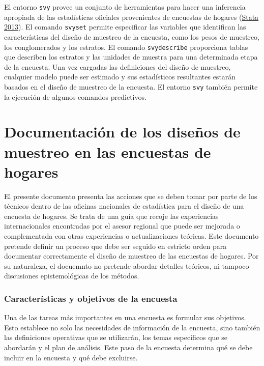 \documentclass[
  12pt,
  spanish,
]{book}
\begin{document}
El entorno \texttt{svy} provee un conjunto de herramientas para hacer una inferencia apropiada de las estadísticas oficiales provenientes de encuestas de hogares (\protect\hyperlink{ref-STATA_2017}{Stata 2013}). El comando \texttt{svyset} permite especificar las variables que identifican las características del diseño de muestreo de la encuesta, como los pesos de muestreo, los conglomerados y los estratos. El comando \texttt{svydescribe} proporciona tablas que describen los estratos y las unidades de muestra para una determinada etapa de la encuesta. Una vez cargadas las definiciones del diseño de muestreo, cualquier modelo puede ser estimado y sus estadísticos resultantes estarán basados en el diseño de muestreo de la encuesta. El entorno \texttt{svy} también permite la ejecución de algunos comandos predictivos.

\hypertarget{documentaciuxf3n-de-los-diseuxf1os-de-muestreo-en-las-encuestas-de-hogares}{%
\chapter{Documentación de los diseños de muestreo en las encuestas de hogares}\label{documentaciuxf3n-de-los-diseuxf1os-de-muestreo-en-las-encuestas-de-hogares}}

El presente documento presenta las acciones que se deben tomar por parte de los técnicos dentro de las oficinas nacionales de estadística para el diseño de una encuesta de hogares. Se trata de una guía que recoje las experiencias internacionales encontradas por el asesor regional que puede ser mejorada o complementada con otras experiencias o actualizaciones teóricas. Este documento pretende definir un proceso que debe ser seguido en estricto orden para documentar correctamente el diseño de muestreo de las encuestas de hogares. Por su naturaleza, el docuemnto no pretende abordar detalles teóricos, ni tampoco discusiones epistemológicas de los métodos.

\hypertarget{caracteruxedsticas-y-objetivos-de-la-encuesta}{%
\subsection*{Características y objetivos de la encuesta}\label{caracteruxedsticas-y-objetivos-de-la-encuesta}}

Una de las tareas más importantes en una encuesta es formular sus objetivos. Esto establece no solo las necesidades de información de la encuesta, sino también las definiciones operativas que se utilizarán, los temas específicos que se abordarán y el plan de análisis. Este paso de la encuesta determina qué se debe incluir en la encuesta y qué debe excluirse.
\end{document}

